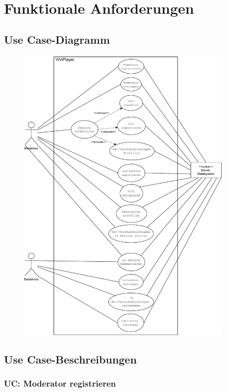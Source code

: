 \section{Funktionale Anforderungen}

\subsection{Use Case-Diagramm}
\begin{figure}[h!]
	\centering
	\includegraphics[width=0.9545\textwidth]{sections/diagrams/viviplyer-uc-diagramm.pdf}
\end{figure}
\pagebreak

\subsection{Use Case-Beschreibungen}

\subsubsection{UC: Moderator registrieren}

\pagebreak

